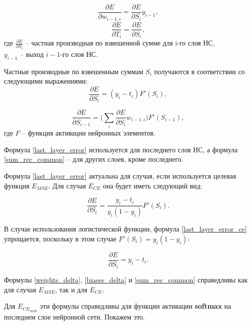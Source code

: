 \begin{equation}
	\label{weights_delta}
	\frac{\partial E}{\partial w_{i-1, i}} = \frac{\partial E}{\partial S_i} y_{i-1},
\end{equation}
\begin{equation}
	\label{biases_delta}
	\frac{\partial E}{\partial T_i} = \frac{\partial E}{\partial S_i},
\end{equation}
где $\frac{\partial E}{\partial S_i}$ -- частная производная по взвешенной сумме для i-го слоя НС,\\
$y_{i-1}$ -- выход $i-1$-го слоя НС.


Частные производные по взвешенным суммам $S_i$ получаются в соответствии со следующими выражениями:
\begin{equation}
	\label{last_layer_error}
	\frac{\partial E}{\partial S_i} = (y_i - t_i)F'(S_i),
\end{equation}

\begin{equation}
	\label{sum_rec_common}
	\frac{\partial E}{\partial S_{i-1}} = \Bigg(\sum_{i}\frac{\partial E}{\partial S_i}w_{i-1, i}\Bigg)F'(S_{i-1}),
\end{equation}
где $F$ -- функция активации нейронных элементов.

Формула \ref{last_layer_error} используется для последнего слоя НС, а формула \ref{sum_rec_common} -- для других слоев, кроме последнего.

Формула \ref{last_layer_error} актуальна для случая, если используется целевая функция $E_{MSE}$. Для случая $E_{CE}$ она будет иметь следующий вид:

\begin{equation}
	\label{last_layer_error_ce}
	\frac{\partial E}{\partial S_i} = \frac{y_i - t_i}{y_i(1-y_i)}F'(S_i).
\end{equation}

В случае использования логистической функции, формула \ref{last_layer_error_ce} упрощается, поскольку в этом случае $F'(S_i)=y_i(1-y_i)$:

\begin{equation}
	\frac{\partial E}{\partial S_i} = y_i - t_i.
\end{equation}

Формулы \ref{weights_delta}, \ref{biases_delta} и \ref{sum_rec_common} справедливы как для случая $E_{MSE}$, так и для $E_{CE}$.

Для $E_{CE_{mult}}$ эти формулы справедливы для функции активации \textbf{softmax} на последнем слое нейронной сети. Покажем это.


